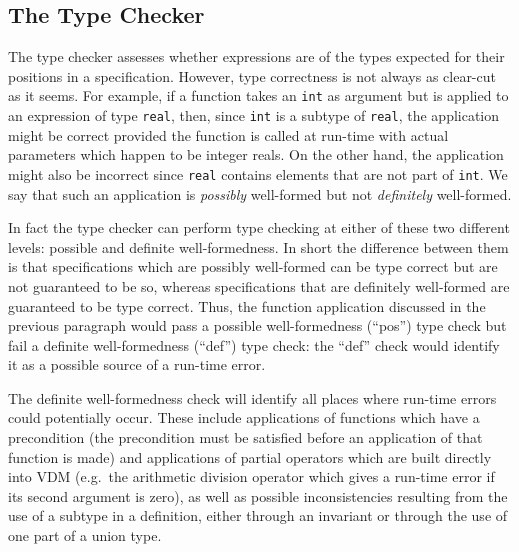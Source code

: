 \documentclass[\pformat,12pt]{article}
\newcommand{\aaa}{\tt }
\begin{document}
\newpage
\subsection{The Type Checker}\label{sec:tc}
\label{sec:def-typechedk}\label{type check} 

The type checker assesses whether expressions are of the types
expected for their positions in a specification. However, type
correctness is not always as clear-cut as it seems. For example, if a
function takes an {\aaa int} as argument but is applied to an
expression of type {\aaa real}, then, since {\aaa int} is a subtype of
{\aaa real}, the application might be correct
provided the function is called at run-time with actual parameters
which happen to be integer reals. On the other hand, the application
might also be incorrect since {\aaa real} contains elements that are
not part of {\aaa int}. We say that such an application is {\em
  possibly\/} well-formed but not {\em definitely\/} well-formed.

In fact the type checker can perform type checking at either of these
two different levels: possible and definite well-formedness. In short
the difference between them is that specifications which are possibly
well-formed can be type correct but are not guaranteed to be so,
whereas specifications that are definitely well-formed are guaranteed
to be type correct. Thus, the function
application discussed in the previous paragraph  would pass a possible
well-formedness (``pos'') type check 
but fail a definite well-formedness (``def'') type check: 
the ``def'' check would identify it as a possible source of a run-time error.

The definite well-formedness check  will identify all places where
run-time errors could potentially occur. These include applications of
functions which have a precondition (the precondition must be
satisfied before an application of that function is made) and
applications of partial operators which are built directly into VDM
(e.g.\ the arithmetic division operator which gives a run-time error
if its second argument is zero), as well as possible inconsistencies
resulting from the use of a subtype in a definition, either through an
invariant or through the use of one part of a union type.
\end{document}
